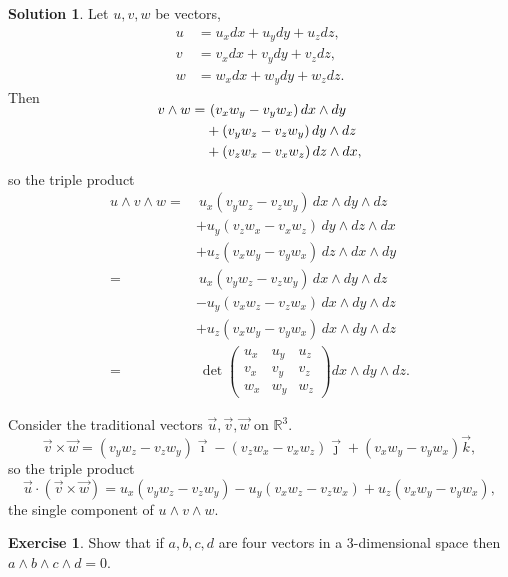 \documentclass[11pt, a4paper]{article}
\theoremstyle{definition}
\newtheorem{ex}{Exercise}[part]
\newtheorem{sol}{Solution}[part]
\begin{document}
\begin{sol}

Let $u, v, w$ be vectors,
\begin{align*}
    u &= u_x dx + u_y dy + u_z dz, \\
    v &= v_x dx + v_y dy + v_z dz, \\
    w &= w_x dx + w_y dy + w_z dz.
\end{align*}
Then
\begin{align*}
    \SwapAboveDisplaySkip
    v \wedge w =&\ (v_x w_y - v_y w_x) \, dx \wedge dy \\
                &+ (v_y w_z - v_z w_y) \, dy \wedge dz \\
                &+ (v_z w_x - v_x w_z) \, dz \wedge dx,
\end{align*}
so the triple product
\begin{align*}
    u \wedge v \wedge w =&\ u_x (v_y w_z - v_z w_y) \, dx \wedge dy \wedge dz \\
        &+ u_y (v_z w_x - v_x w_z) \, dy \wedge dz \wedge dx \\
        &+ u_z (v_x w_y - v_y w_x) \, dz \wedge dx \wedge dy \\
        =&\ u_x (v_y w_z - v_z w_y) \, dx \wedge dy \wedge dz \\
        &- u_y (v_x w_z - v_z w_x) \, dx \wedge dy \wedge dz \\
        &+ u_z (v_x w_y - v_y w_x) \, dx \wedge dy \wedge dz \\
        =&\ \det \begin{pmatrix}
                u_x & u_y & u_z \\
                v_x & v_y & v_z \\
                w_x & w_y & w_z
            \end{pmatrix} dx \wedge dy \wedge dz.
\end{align*}

Consider the traditional vectors $\vec{u}, \vec{v}, \vec{w}$ on $\mathbb{R}^3$.
\[
    \vec{v} \times \vec{w}
        = (v_y w_z - v_z w_y) \vec{\imath}
          - (v_z w_x - v_x w_z) \vec{\jmath}
          + (v_x w_y - v_y w_x) \vec{k},
\]
so the triple product
\[
    \vec{u} \cdot (\vec{v} \times \vec{w})
        = u_x (v_y w_z - v_z w_y)
          - u_y (v_x w_z - v_z w_x)
          + u_z (v_x w_y - v_y w_x),
\]
the single component of $u \wedge v \wedge w$.

\end{sol}

\begin{ex}

Show that if $a, b, c, d$ are four vectors in a 3-dimensional space then $a \wedge b \wedge c \wedge d = 0$.

\end{ex}
\end{document}
